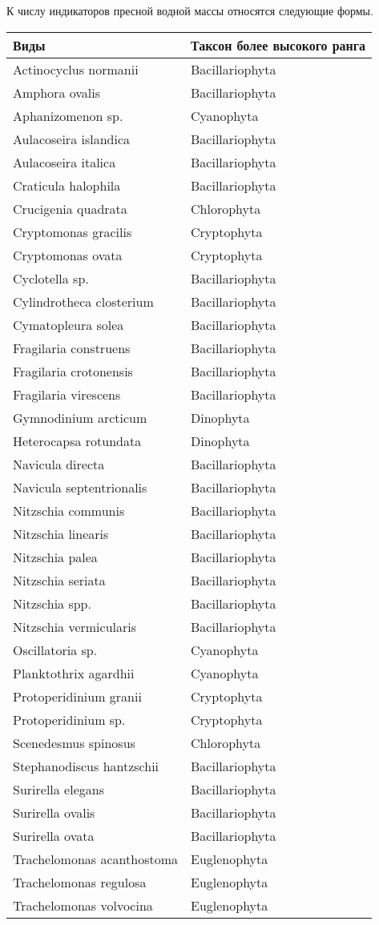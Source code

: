 \documentclass[
]{article}
\begin{document}
К числу индикаторов пресной водной массы относятся следующие формы.

\begin{longtable}[]{@{}ll@{}}
\toprule
Виды & Таксон более высокого ранга \\
\midrule
\endhead
Actinocyclus normanii & Bacillariophyta \\
Amphora ovalis & Bacillariophyta \\
Aphanizomenon sp. & Cyanophyta \\
Aulacoseira islandica & Bacillariophyta \\
Aulacoseira italica & Bacillariophyta \\
Craticula halophila & Bacillariophyta \\
Crucigenia quadrata & Chlorophyta \\
Cryptomonas gracilis & Cryptophyta \\
Cryptomonas ovata & Cryptophyta \\
Cyclotella sp. & Bacillariophyta \\
Cylindrotheca closterium & Bacillariophyta \\
Cymatopleura solea & Bacillariophyta \\
Fragilaria construens & Bacillariophyta \\
Fragilaria crotonensis & Bacillariophyta \\
Fragilaria virescens & Bacillariophyta \\
Gymnodinium arcticum & Dinophyta \\
Heterocapsa rotundata & Dinophyta \\
Navicula directa & Bacillariophyta \\
Navicula septentrionalis & Bacillariophyta \\
Nitzschia communis & Bacillariophyta \\
Nitzschia linearis & Bacillariophyta \\
Nitzschia palea & Bacillariophyta \\
Nitzschia seriata & Bacillariophyta \\
Nitzschia spp. & Bacillariophyta \\
Nitzschia vermicularis & Bacillariophyta \\
Oscillatoria sp. & Cyanophyta \\
Planktothrix agardhii & Cyanophyta \\
Protoperidinium granii & Cryptophyta \\
Protoperidinium sp. & Cryptophyta \\
Scenedesmus spinosus & Chlorophyta \\
Stephanodiscus hantzschii & Bacillariophyta \\
Surirella elegans & Bacillariophyta \\
Surirella ovalis & Bacillariophyta \\
Surirella ovata & Bacillariophyta \\
Trachelomonas acanthostoma & Euglenophyta \\
Trachelomonas regulosa & Euglenophyta \\
Trachelomonas volvocina & Euglenophyta \\
\bottomrule
\end{longtable}
\end{document}
